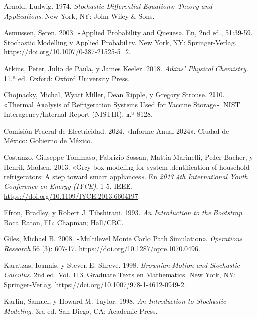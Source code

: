 \documentclass[
  spanish,
  letterpaper,
  DIV=11,
  numbers=noendperiod]{scrreprt}
\newlength{\cslhangindent}
\newenvironment{CSLReferences}[2] %
 {\begin{list}{}{%
  \setlength{\itemindent}{0pt}
  \setlength{\leftmargin}{0pt}
  \setlength{\parsep}{0pt}
  \ifodd #1
   \setlength{\leftmargin}{\cslhangindent}
   \setlength{\itemindent}{-1\cslhangindent}
  \fi
  \setlength{\itemsep}{#2\baselineskip}}}
 {\end{list}}
\theoremstyle{plain}
\theoremstyle{plain}
\theoremstyle{plain}
\theoremstyle{definition}
\theoremstyle{remark}
\begin{document}

\label{refs}
\begin{CSLReferences}{1}{0}
Arnold, Ludwig. 1974. \emph{Stochastic Differential Equations: Theory
and Applications}. New York, NY: John Wiley \& Sons.

Asmussen, Søren. 2003. {«Applied Probability and Queues»}. En, 2nd ed.,
51:39-59. Stochastic Modelling y Applied Probability. New York, NY:
Springer-Verlag. \url{https://doi.org/10.1007/0-387-21525-5_2}.

Atkins, Peter, Julio de Paula, y James Keeler. 2018. \emph{Atkins'
Physical Chemistry}. 11.ª ed. Oxford: Oxford University Press.

Chojnacky, Michal, Wyatt Miller, Dean Ripple, y Gregory Strouse. 2010.
{«Thermal Analysis of Refrigeration Systems Used for Vaccine Storage»}.
NIST Interagency/Internal Report (NISTIR), n.º 8128.

Comisión Federal de Electricidad. 2024. {«Informe Anual 2024»}. Ciudad
de México: Gobierno de México.

Costanzo, Giuseppe Tommaso, Fabrizio Sossan, Mattia Marinelli, Peder
Bacher, y Henrik Madsen. 2013. {«Grey-box modeling for system
identification of household refrigerators: A step toward smart
appliances»}. En \emph{2013 4th International Youth Conference on Energy
(IYCE)}, 1-5. IEEE. \url{https://doi.org/10.1109/IYCE.2013.6604197}.

Efron, Bradley, y Robert J. Tibshirani. 1993. \emph{An Introduction to
the Bootstrap}. Boca Raton, FL: Chapman; Hall/CRC.

Giles, Michael B. 2008. {«Multilevel {Monte Carlo} Path Simulation»}.
\emph{Operations Research} 56 (3): 607-17.
\url{https://doi.org/10.1287/opre.1070.0496}.

Karatzas, Ioannis, y Steven E. Shreve. 1998. \emph{Brownian Motion and
Stochastic Calculus}. 2nd ed. Vol. 113. Graduate Texts en Mathematics.
New York, NY: Springer-Verlag.
\url{https://doi.org/10.1007/978-1-4612-0949-2}.

Karlin, Samuel, y Howard M. Taylor. 1998. \emph{An Introduction to
Stochastic Modeling}. 3rd ed. San Diego, CA: Academic Press.


\end{CSLReferences}
\end{document}
